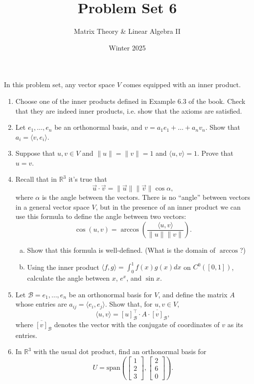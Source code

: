 \documentclass[a4paper,11pt]{article}
\title{Problem Set 6}
\author{Matrix Theory \& Linear Algebra II}
\date{Winter 2025}
\theoremstyle{definition}
\begin{document}
\maketitle
\thispagestyle{empty}


\noindent
In this problem set, any vector space $V$ comes equipped with an inner product.
\begin{enumerate}[(1)]
    \item 
    Choose one of the inner products defined in Example 6.3 of the book.
    Check that they are indeed inner products, i.e. show that the axioms are satisfied.
    \item
    Let $e_1,\dots,e_n$ be an orthonormal basis, and $v=a_1e_1+\dots+a_nv_n$.
    Show that $a_i = \langle v,e_i\rangle$.
    \item 
    Suppose that $u,v\in V$ and $\|u\|=\|v\|=1$ and $\langle u,v\rangle =1$.
    Prove that $u=v$.
    \item 
    Recall that in $\mathbb R^3$ it's true that
    \[
    \vec u\cdot \vec v = \|\vec u\|\|\vec v\|\cos\alpha,
    \]
    where $\alpha$ is the angle between the vectors.
    There is no ``angle'' between vectors in a general vector space $V$, but in the presence of an inner product we can use this formula to define the angle between two vectors:
    \[
        \cos(u,v) =\arccos\left(\dfrac{\langle u,v\rangle}{\|u\|\|v\|}\right).
    \]
    \begin{enumerate}[(a)]
    \item 
    Show that this formula is well-defined.
    (What is the domain of $\arccos$?)
    \item 
    Using the inner product $\langle f,g\rangle=\int_0^1 f(x)g(x)dx$ on $C^0([0,1])$, calculate the angle between $x$, $e^x$, and $\sin x$. 
    \end{enumerate}
    \item 
    Let $\mathcal B = e_1,\dots,e_n$ be an orthonormal basis for $V$, and define the matrix $A$ whose entries are $a_{ij} = \langle e_i,e_j\rangle$.
    Show that, for $u,v\in V$,
    \[
    \langle u,v\rangle = [u]_\mathcal B^\intercal \cdot A \cdot \overline{[v]}_\mathcal B,
    \]
    where $\overline{[v]}_\mathcal B$ denotes the vector with the conjugate of coordinates of $v$ as its entries.

    \item 
    In $\mathbb R^3$ with the usual dot product, find an orthonormal basis for
    \[
    U = \text{span}\left(\begin{bmatrix}
        1\\2\\3
    \end{bmatrix},\begin{bmatrix}
        2\\6\\0
    \end{bmatrix}\right).
    \]


\end{enumerate}
\end{document}
